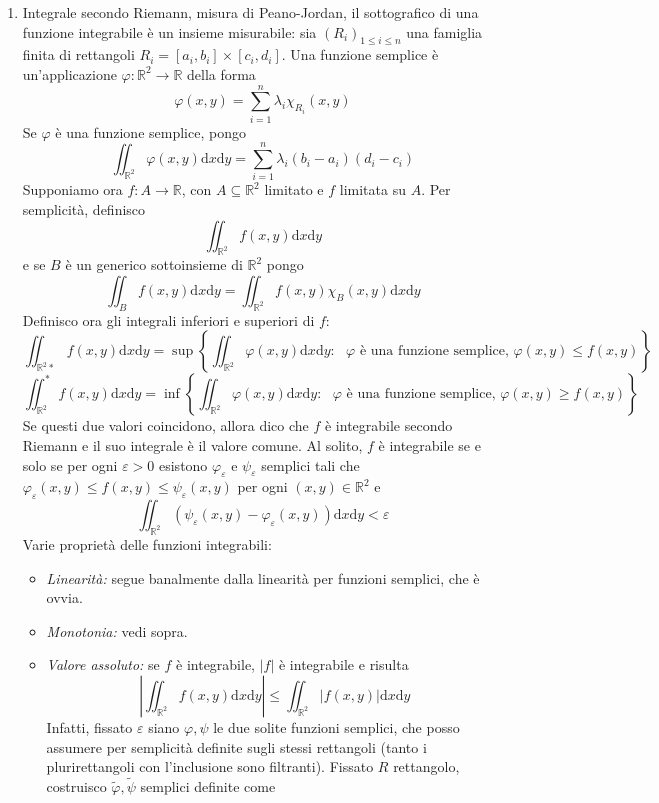 \documentclass[a4paper,11pt]{article}
\begin{document}
\begin{enumerate}
	
	\item Integrale secondo Riemann, misura di Peano-Jordan, il sottografico di una funzione integrabile è un insieme misurabile: sia $(R_i)_{1\leq i\leq n}$ una famiglia finita di rettangoli $R_i=[a_i,b_i]\times[c_i,d_i]$. Una funzione semplice è un'applicazione $\varphi\colon\mathbb{R}^2\to\mathbb{R}$ della forma
	\[\varphi(x,y)=\sum_{i=1}^{n}\lambda_i\chi_{R_i}(x,y)\]
	Se $\varphi$ è una funzione semplice, pongo
	\[\iint_{\mathbb{R}^2}\varphi(x,y)\mathrm{d}x\mathrm{d}y=\sum_{i=1}^{n}\lambda_i(b_i-a_i)(d_i-c_i)\]
	Supponiamo ora $f\colon A\to\mathbb{R}$, con $A\subseteq\mathbb{R}^2$ limitato e $f$ limitata su $A$. Per semplicità, definisco
	\[\iint_{\mathbb{R}^2}f(x,y)\mathrm{d}x\mathrm{d}y\]
	e se $B$ è un generico sottoinsieme di $\mathbb{R}^2$ pongo 
	\[\iint_Bf(x,y)\mathrm{d}x\mathrm{d}y=\iint_{\mathbb{R}^2}f(x,y)\chi_B(x,y)\mathrm{d}x\mathrm{d}y\]
	Definisco ora gli integrali inferiori e superiori di $f$:
	\[\iint_{\mathbb{R}^2*}f(x,y)\mathrm{d}x\mathrm{d}y=\sup\left\{\iint_{\mathbb{R}^2}\varphi(x,y)\mathrm{d}x\mathrm{d}y:\textrm{ $\varphi$ è una funzione semplice, }\varphi(x,y)\leq f(x,y)\right\}\]
	\[\iint_{\mathbb{R}^2}^*f(x,y)\mathrm{d}x\mathrm{d}y=\inf\left\{\iint_{\mathbb{R}^2}\varphi(x,y)\mathrm{d}x\mathrm{d}y:\textrm{ $\varphi$ è una funzione semplice, }\varphi(x,y)\geq f(x,y)\right\}\]
	Se questi due valori coincidono, allora dico che $f$ è integrabile secondo Riemann e il suo integrale è il valore comune.
	Al solito, $f$ è integrabile se e solo se per ogni $\varepsilon>0$ esistono $\varphi_\varepsilon$ e $\psi_\varepsilon$ semplici tali che $\varphi_\varepsilon(x,y)\leq f(x,y)\leq\psi_\varepsilon(x,y)$ per ogni $(x,y)\in\mathbb{R}^2$ e
	\[\iint_{\mathbb{R}^2}(\psi_\varepsilon(x,y)-\varphi_\varepsilon(x,y))\mathrm{d}x\mathrm{d}y<\varepsilon\]
	Varie proprietà delle funzioni integrabili:
	\begin{itemize}
		\item\textit{Linearità:} segue banalmente dalla linearità per funzioni semplici, che è ovvia.
		\item\textit{Monotonia:} vedi sopra.
		\item\textit{Valore assoluto:} se $f$ è integrabile, $|f|$ è integrabile e risulta
		\[\left|\iint_{\mathbb{R}^2}f(x,y)\mathrm{d}x\mathrm{d}y\right|\leq\iint_{\mathbb{R}^2}\left|f(x,y)\right|\mathrm{d}x\mathrm{d}y\]
		Infatti, fissato $\varepsilon$ siano $\varphi,\psi$ le due solite funzioni semplici, che posso assumere per semplicità definite sugli stessi rettangoli (tanto i plurirettangoli con l'inclusione sono filtranti). Fissato $R$ rettangolo, costruisco $\tilde{\varphi},\tilde{\psi}$ semplici definite come

\end{itemize}
\end{enumerate}
\end{document}

